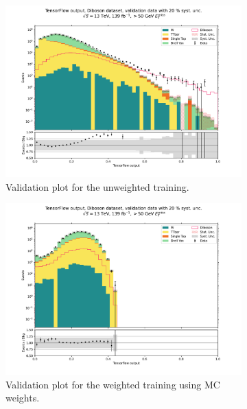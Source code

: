 \documentclass[14pt, a4paper]{book}
\begin{document}
\graphicspath{{../../../Plots/NeuralNetwork/Diboson/}} 
\begin{figure}[!ht]
	\centering
	\begin{subfigure}[b]{0.49\textwidth}
        \centering
        \includegraphics[width=1\textwidth]{Unweighted/VAL.pdf}
        \caption{Validation plot for the unweighted training.}\label{fig:DibosonVALUW}
     \end{subfigure}
     \hfill
     \begin{subfigure}[b]{0.49\textwidth}
        \centering
        \includegraphics[width=1\textwidth]{Weighted/VAL.pdf}
        \caption{Validation plot for the weighted training using MC weights.}\label{fig:DibosonVALMC}
     \end{subfigure}
     \begin{subfigure}[b]{0.49\textwidth}

\end{subfigure}
\end{figure}
\end{document}

